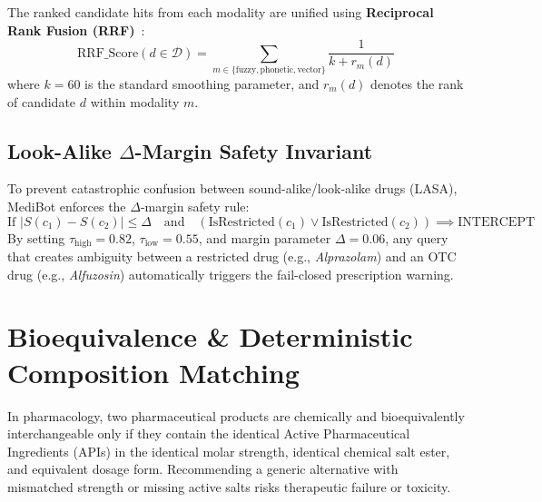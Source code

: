 \documentclass[11pt,a4paper]{article}
\begin{document}
The ranked candidate hits from each modality are unified using \textbf{Reciprocal Rank Fusion (RRF)}~\cite{cormack2009reciprocal}:
\begin{equation}
  \text{RRF\_Score}(d \in \mathcal{D}) = \sum_{m \in \{\text{fuzzy}, \text{phonetic}, \text{vector}\}} \frac{1}{k + r_m(d)}
\end{equation}
where $k = 60$ is the standard smoothing parameter, and $r_m(d)$ denotes the rank of candidate $d$ within modality $m$.

\subsection{Look-Alike \texorpdfstring{$\Delta$}{Delta}-Margin Safety Invariant}
To prevent catastrophic confusion between sound-alike/look-alike drugs (LASA), MediBot enforces the $\Delta$-margin safety rule:
\begin{equation}
  \text{If } |S(c_1) - S(c_2)| \le \Delta \quad \text{and} \quad \left(\text{IsRestricted}(c_1) \lor \text{IsRestricted}(c_2)\right) \implies \text{INTERCEPT}
\end{equation}
By setting $\tau_{\text{high}} = 0.82$, $\tau_{\text{low}} = 0.55$, and margin parameter $\Delta = 0.06$, any query that creates ambiguity between a restricted drug (e.g., \textit{Alprazolam}) and an OTC drug (e.g., \textit{Alfuzosin}) automatically triggers the fail-closed prescription warning.

\section{Bioequivalence \& Deterministic Composition Matching}

In pharmacology, two pharmaceutical products are chemically and bioequivalently interchangeable only if they contain the identical Active Pharmaceutical Ingredients (APIs) in the identical molar strength, identical chemical salt ester, and equivalent dosage form. Recommending a generic alternative with mismatched strength or missing active salts risks therapeutic failure or toxicity.
\end{document}
